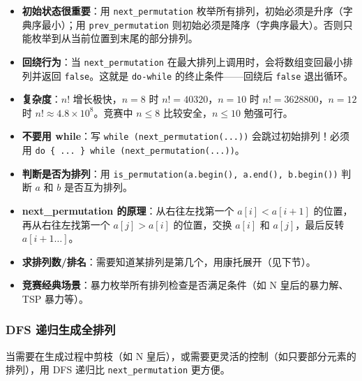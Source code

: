 \documentclass[UTF8,openany,oneside,zihao=-4]{ctexbook}
\begin{document}
\begin{warn}
\begin{itemize}
  \item \textbf{初始状态很重要}：用 \lstinline|next_permutation| 枚举所有排列，初始必须是升序（字典序最小）；用 \lstinline|prev_permutation| 则初始必须是降序（字典序最大）。否则只能枚举到从当前位置到末尾的部分排列。
  \item \textbf{回绕行为}：当 \lstinline|next_permutation| 在最大排列上调用时，会将数组变回最小排列并返回 \lstinline|false|。这就是 \lstinline|do-while| 的终止条件——回绕后 \lstinline|false| 退出循环。
  \item \textbf{复杂度}：$n!$ 增长极快，$n = 8$ 时 $n! = 40320$，$n = 10$ 时 $n! = 3628800$，$n = 12$ 时 $n! \approx 4.8 \times 10^8$。竞赛中 $n \le 8$ 比较安全，$n \le 10$ 勉强可行。
  \item \textbf{不要用 while}：写 \lstinline|while (next_permutation(...))| 会跳过初始排列！必须用 \lstinline|do { ... } while (next_permutation(...))|。
\end{itemize}
\end{warn}

\begin{tip}
\begin{itemize}
  \item \textbf{判断是否为排列}：用 \lstinline|is_permutation(a.begin(), a.end(), b.begin())| 判断 $a$ 和 $b$ 是否互为排列。
  \item \textbf{next\_permutation 的原理}：从右往左找第一个 $a[i] < a[i+1]$ 的位置，再从右往左找第一个 $a[j] > a[i]$ 的位置，交换 $a[i]$ 和 $a[j]$，最后反转 $a[i+1 \ldots]$。
  \item \textbf{求排列数/排名}：需要知道某排列是第几个，用康托展开（见下节）。
  \item \textbf{竞赛经典场景}：暴力枚举所有排列检查是否满足条件（如 N 皇后的暴力解、TSP 暴力等）。
\end{itemize}
\end{tip}

\subsubsection{DFS 递归生成全排列}

\begin{note}
当需要在生成过程中剪枝（如 N 皇后），或需要更灵活的控制（如只要部分元素的排列），用 DFS 递归比 \lstinline|next_permutation| 更方便。
\end{note}
\end{document}
